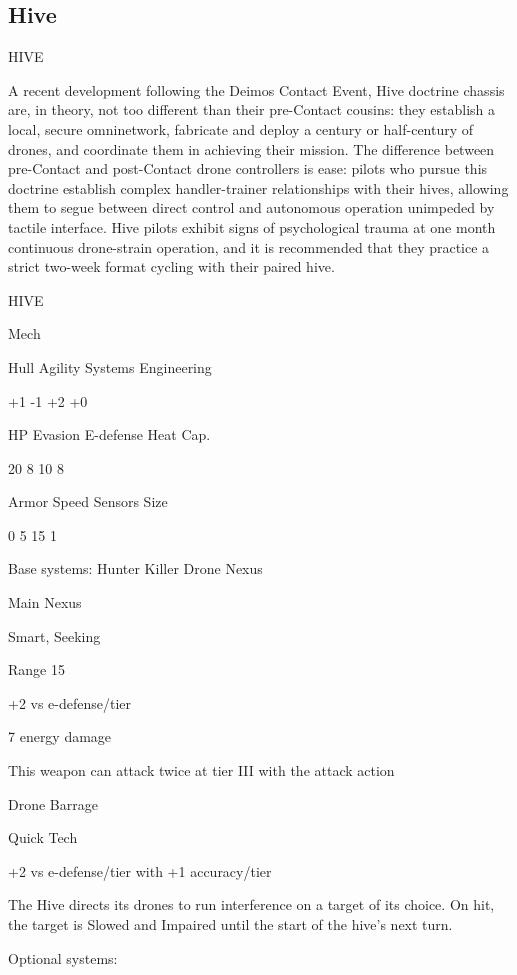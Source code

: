 \subsection{Hive}

                                                   HIVE

A recent development following the Deimos Contact Event, Hive doctrine chassis are, in theory,
not too different than their pre-Contact cousins: they establish a local, secure omninetwork,
fabricate and deploy a century or half-century of drones, and coordinate them in achieving their
mission. The difference between pre-Contact and post-Contact drone controllers is ease: pilots
who pursue this doctrine establish complex handler-trainer relationships with their hives, allowing
them to segue between direct control and autonomous operation unimpeded by tactile interface.
Hive pilots exhibit signs of psychological trauma at one month continuous drone-strain operation,
and it is recommended that they practice a strict two-week format cycling with their paired hive.

 HIVE

 Mech

 Hull       Agility      Systems       Engineering

 +1         -1           +2            +0

 HP         Evasion      E-defense     Heat Cap.

 20         8            10            8

 Armor      Speed        Sensors       Size

 0          5            15            1

Base systems:
Hunter Killer Drone Nexus

Main Nexus

Smart, Seeking

Range 15

+2 vs e-defense/tier

7 energy damage

This weapon can attack twice at tier III with the attack action


Drone Barrage

Quick Tech

+2 vs e-defense/tier with +1 accuracy/tier

The Hive directs its drones to run interference on a target of its choice. On hit, the target is
Slowed and Impaired until the start of the hive’s next turn.


Optional systems:

